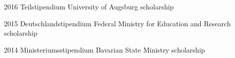 {\award%
{%
2016
}{%
Teilstipendium
}{%
University of Augsburg
}{%
scholarship
}



\award%
{%
2015
}{%
Deutschlandstipendium
}{%
Federal Ministry for Education and Research %
}{%
scholarship %
}

\award%
{%
2014
}{%
Ministeriumsstipendium
}{%
Bavarian State Ministry %
}{%
scholarship
}

}{%
}{%
}


